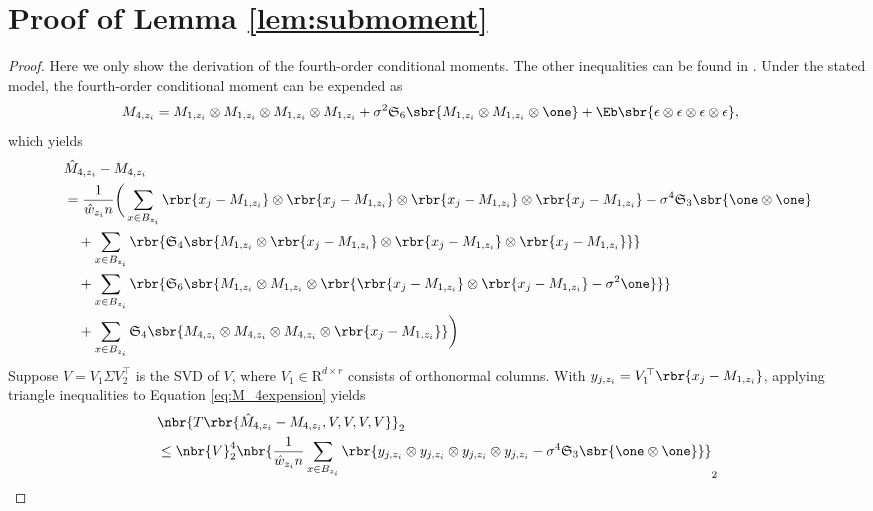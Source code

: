 \documentclass[twoside,11pt]{article}
\newcommand{\symm}{\mathfrak{S}}
\begin{document}
{\section{ Proof of Lemma \ref{lem:submoment}}

\label{proof:reconstruction3}
\begin{proof}
Here we only show the derivation of the fourth-order conditional moments. The other inequalities can be found in \cite{HsuKak12}. Under the stated model, the fourth-order conditional moment can be expended as
  \begin{align*}
    M_{4,z_i} &= M_{1,z_i} \otimes M_{1,z_i} \otimes M_{1,z_i} \otimes M_{1,z_i} + \sigma^2 \symm_6\sbr{M_{1,z_i} \otimes M_{1,z_i} \otimes \one} + \Eb \sbr{\epsilon  \otimes \epsilon  \otimes \epsilon \otimes \epsilon },
  \end{align*}
 which yields
  \begin{align}
  \label{eq:M_4expension}
    &\hat{M}_{4,z_i}-  M_{4,z_i} \nonumber\\
    &= \frac{1}{\hat{w}_{z_i}n} \bigg(\sum \limits_{x \in B_{z_i}} \rbr{x_j-M_{1,z_i}}\otimes\rbr{x_j-M_{1,z_i}}\otimes\rbr{x_j-M_{1,z_i}}\otimes\rbr{x_j-M_{1,z_i}} - \sigma^4 \symm_3 \sbr{\one \otimes \one}\nonumber\\
    &\,\,\,\,\,\,+  \sum \limits_{x \in B_{z_i}} \rbr{ \symm_4 \sbr{M_{1,z_i} \otimes \rbr{x_j - M_{1,z_i}}\otimes \rbr{x_j - M_{1,z_i}}\otimes \rbr{x_j - M_{1,z_i}} } }\nonumber\\
    &\,\,\,\,\,\,+\sum \limits_{x \in B_{z_i}} \rbr{ \symm_6 \sbr{M_{1,z_i} \otimes M_{1,z_i} \otimes \rbr{ \rbr{x_j - M_{1,z_i}}\otimes \rbr{x_j - M_{1,z_i}} - \sigma^2 \one }}} \nonumber\\
    &\,\,\,\,\,\,+\sum \limits_{x \in B_{z_i}}\symm_4 \sbr{ M_{4,z_i}\otimes  M_{4,z_i}\otimes M_{4,z_i}\otimes\rbr{x_j-M_{1,z_i}}  } 
\bigg)
  \end{align}
Suppose $V = V_1 \Sigma V_2^\top $ is the SVD of $V$, where $V_1 \in \mathrm{R}^{d \times r}$ consists of orthonormal columns. With $y_{j,z_i} = V_1^\top \rbr{x_j-M_{1,z_i}}$, applying triangle inequalities to Equation \eqref{eq:M_4expension} yields
  \begin{align*}
    &\nbr{T\rbr{\hat{M}_{4,z_i}-  M_{4,z_i},V,V,V,V}}_2 \\
    &\leq \nbr{V}_2^4 \nbr{  \frac{1}{\hat{w}_{z_i}n} \sum \limits_{x \in B_{z_i}} \rbr{ y_{j,z_i}\otimes y_{j,z_i}\otimes y_{j,z_i}\otimes y_{j,z_i}  -  \sigma^4 \symm_3 \sbr{\one \otimes \one}  }  }_2\\

\end{align*}
\end{proof}}
\end{document}
